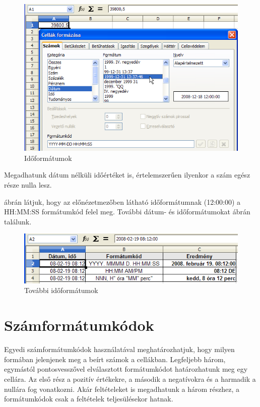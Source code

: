 \begin{figure}[!h]
\begin{center}
\includegraphics[width=15.027cm]{oocalcv2-img49.png}
\caption{Időformátumok}\label{Időformátumok}
\end{center}
\end{figure}
Megadhatunk dátum nélküli időértéket is,
értelemszerűen ilyenkor a szám egész része nulla lesz.

 ábrán látjuk, hogy az előnézetmezőben látható
időformátumnak (12:00:00) a HH:MM:SS formátumkód felel meg.
További dátum- és időformátumokat  ábrán
találunk.

\begin{figure}[!h]
\begin{center}
\includegraphics[width=13.995cm]{oocalcv2-img50.png}
\caption{További időformátumok}\label{TovábbiIdőformátumok}
\end{center}
\end{figure}

\clearpage
\section{Számformátumkódok}

Egyedi számformátumkódok használatával meghatározhatjuk,
hogy milyen formában jelenjenek meg a beírt számok a cellákban.
Legfeljebb három, egymástól pontosvesszővel elválasztott
formátumkódot határozhatunk meg egy cellára. Az első rész
a pozitív értékekre, a második a negatívokra és a harmadik
a nullára fog vonatkozni. Akár feltételeket is megadhatunk a
három részhez, a formátumkódok csak a feltételek
teljesülésekor hatnak.

